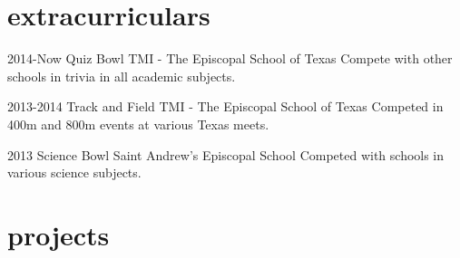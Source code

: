 \documentclass[]{friggeri-cv} %
\begin{document}
\section{extracurriculars}

\begin{entrylist}


\entry
{2014-Now}
{Quiz Bowl}
{TMI - The Episcopal School of Texas}
{Compete with other schools in trivia in all academic subjects.}


\entry
{2013-2014}
{Track and Field}
{TMI - The Episcopal School of Texas}
{Competed in 400m and 800m events at various Texas meets.}


\entry
{2013}
{Science Bowl}
{Saint Andrew's Episcopal School}
{Competed with schools in various science subjects.}


\end{entrylist}


\section{projects}
\end{document}
